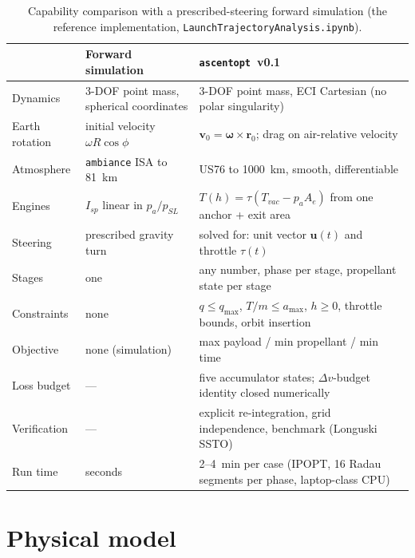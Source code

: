 \documentclass[11pt,a4paper]{article}
\newcommand{\tool}{\texttt{ascentopt}}
\newcommand{\dv}{\Delta v}
\begin{document}
\begin{table}[h]\centering\small
\caption{Capability comparison with a prescribed-steering forward simulation (the reference implementation, \texttt{LaunchTrajectoryAnalysis.ipynb}).}
\label{tab:compare}
\begin{tabular}{p{4.2cm}p{5.2cm}p{5.8cm}}
\toprule
 & Forward simulation & \tool\ v0.1 \\
\midrule
Dynamics & 3-DOF point mass, spherical coordinates & 3-DOF point mass, ECI Cartesian (no polar singularity) \\
Earth rotation & initial velocity $\omega R\cos\phi$ & $\bm v_0 = \bm\omega\times\bm r_0$; drag on air-relative velocity \\
Atmosphere & \texttt{ambiance} ISA to 81~km & US76 to 1000~km, smooth, differentiable \\
Engines & $I_{sp}$ linear in $p_a/p_{SL}$ & $T(h)=\tau(T_{vac}-p_aA_e)$ from one anchor + exit area \\
Steering & prescribed gravity turn & solved for: unit vector $\bm u(t)$ and throttle $\tau(t)$ \\
Stages & one & any number, phase per stage, propellant state per stage \\
Constraints & none & $q\le q_{\max}$, $T/m\le a_{\max}$, $h\ge0$, throttle bounds, orbit insertion \\
Objective & none (simulation) & max payload / min propellant / min time \\
Loss budget & --- & five accumulator states; $\dv$-budget identity closed numerically \\
Verification & --- & explicit re-integration, grid independence, benchmark (Longuski SSTO) \\
Run time & seconds & 2--4~min per case (IPOPT, 16 Radau segments per phase, laptop-class CPU) \\
\bottomrule
\end{tabular}
\end{table}

\section{Physical model}
\label{sec:model}
\end{document}
